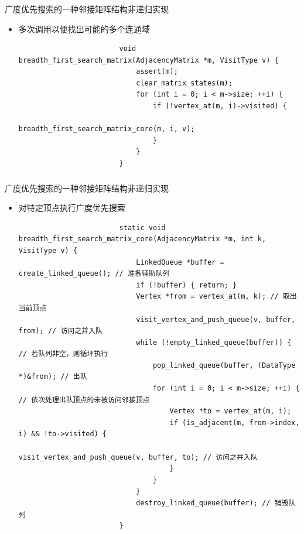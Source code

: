 \begin{fragile}
    \frametitle{\insertsubsectionhead}
    \begin{block}{广度优先搜索的一种\alert{邻接矩阵}结构非递归实现}
        \begin{itemize}
            \item 多次调用以便找出可能的多个连通域
                    \begin{verbatim}
                        void breadth_first_search_matrix(AdjacencyMatrix *m, VisitType v) {
                            assert(m);
                            clear_matrix_states(m);
                            for (int i = 0; i < m->size; ++i) {
                                if (!vertex_at(m, i)->visited) {
                                    breadth_first_search_matrix_core(m, i, v);
                                }
                            }
                        }
                    \end{verbatim}
        \end{itemize}
    \end{block}
\end{fragile}

\begin{fragile}
    \frametitle{\insertsubsectionhead}
    \begin{block}{广度优先搜索的一种\alert{邻接矩阵}结构非递归实现}
        \begin{itemize}
            \item 对特定顶点执行广度优先搜索
                    \begin{verbatim}
                        static void breadth_first_search_matrix_core(AdjacencyMatrix *m, int k, VisitType v) {
                            LinkedQueue *buffer = create_linked_queue(); // 准备辅助队列
                            if (!buffer) { return; }
                            Vertex *from = vertex_at(m, k); // 取出当前顶点
                            visit_vertex_and_push_queue(v, buffer, from); // 访问之并入队
                            while (!empty_linked_queue(buffer)) { // 若队列非空，则循环执行
                                pop_linked_queue(buffer, (DataType *)&from); // 出队
                                for (int i = 0; i < m->size; ++i) { // 依次处理出队顶点的未被访问邻接顶点
                                    Vertex *to = vertex_at(m, i);
                                    if (is_adjacent(m, from->index, i) && !to->visited) {
                                        visit_vertex_and_push_queue(v, buffer, to); // 访问之并入队
                                    }
                                }
                            }
                            destroy_linked_queue(buffer); // 销毁队列
                        }
                    \end{verbatim}
        \end{itemize}
    \end{block}
\end{fragile}

